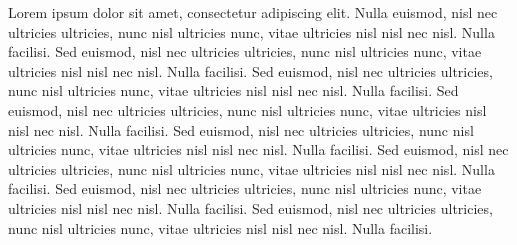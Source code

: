 \documentclass[
]{article}
\begin{document}
Lorem ipsum dolor sit amet, consectetur adipiscing elit. Nulla euismod,
nisl nec ultricies ultricies, nunc nisl ultricies nunc, vitae ultricies
nisl nisl nec nisl. Nulla facilisi. Sed euismod, nisl nec ultricies
ultricies, nunc nisl ultricies nunc, vitae ultricies nisl nisl nec nisl.
Nulla facilisi. Sed euismod, nisl nec ultricies ultricies, nunc nisl
ultricies nunc, vitae ultricies nisl nisl nec nisl. Nulla facilisi. Sed
euismod, nisl nec ultricies ultricies, nunc nisl ultricies nunc, vitae
ultricies nisl nisl nec nisl. Nulla facilisi. Sed euismod, nisl nec
ultricies ultricies, nunc nisl ultricies nunc, vitae ultricies nisl nisl
nec nisl. Nulla facilisi. Sed euismod, nisl nec ultricies ultricies,
nunc nisl ultricies nunc, vitae ultricies nisl nisl nec nisl. Nulla
facilisi. Sed euismod, nisl nec ultricies ultricies, nunc nisl ultricies
nunc, vitae ultricies nisl nisl nec nisl. Nulla facilisi. Sed euismod,
nisl nec ultricies ultricies, nunc nisl ultricies nunc, vitae ultricies
nisl nisl nec nisl. Nulla facilisi.
\end{document}
